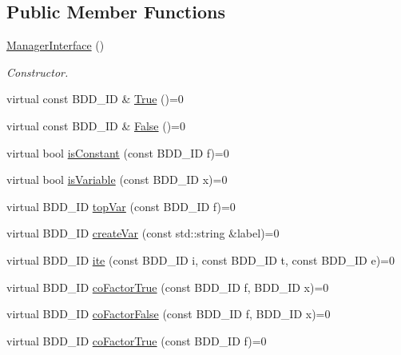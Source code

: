 \subsection*{Public Member Functions}
\begin{DoxyCompactItemize}
\item 
\mbox{\label{classManagerInterface_a9c0561998e278c6f55dc9e1501786f73}} 
\hyperlink{classManagerInterface_a9c0561998e278c6f55dc9e1501786f73}{Manager\+Interface} ()
\begin{DoxyCompactList}\small\item\em Constructor. \end{DoxyCompactList}\item 
virtual const B\+D\+D\+\_\+\+ID \& \hyperlink{classManagerInterface_abb06c4fac2f82fd9fc920afb395e7530}{True} ()=0
\item 
virtual const B\+D\+D\+\_\+\+ID \& \hyperlink{classManagerInterface_a8c5b3c1ebadc5c76e40e1648f5d459ca}{False} ()=0
\item 
virtual bool \hyperlink{classManagerInterface_a44d4002c509fa7a1c82747113ca0a09a}{is\+Constant} (const B\+D\+D\+\_\+\+ID f)=0
\item 
virtual bool \hyperlink{classManagerInterface_abed179c55a9e627784993ccfafca0841}{is\+Variable} (const B\+D\+D\+\_\+\+ID x)=0
\item 
virtual B\+D\+D\+\_\+\+ID \hyperlink{classManagerInterface_a89c9fcb50dcce71b530ead67c60b670f}{top\+Var} (const B\+D\+D\+\_\+\+ID f)=0
\item 
virtual B\+D\+D\+\_\+\+ID \hyperlink{classManagerInterface_a594a44f1304270f150257cfd5f7aa103}{create\+Var} (const std\+::string \&label)=0
\item 
virtual B\+D\+D\+\_\+\+ID \hyperlink{classManagerInterface_a099c8fab45923f6a30e4f2c53052e511}{ite} (const B\+D\+D\+\_\+\+ID i, const B\+D\+D\+\_\+\+ID t, const B\+D\+D\+\_\+\+ID e)=0
\item 
virtual B\+D\+D\+\_\+\+ID \hyperlink{classManagerInterface_a59efaa2b648ea1aa71da4bf0c817ee8c}{co\+Factor\+True} (const B\+D\+D\+\_\+\+ID f, B\+D\+D\+\_\+\+ID x)=0
\item 
virtual B\+D\+D\+\_\+\+ID \hyperlink{classManagerInterface_af5ea9287d7b926763f4972457ba067c7}{co\+Factor\+False} (const B\+D\+D\+\_\+\+ID f, B\+D\+D\+\_\+\+ID x)=0
\item 
virtual B\+D\+D\+\_\+\+ID \hyperlink{classManagerInterface_a205c88e6546302e6d41d4239b38ecb12}{co\+Factor\+True} (const B\+D\+D\+\_\+\+ID f)=0

\end{DoxyCompactItemize}
